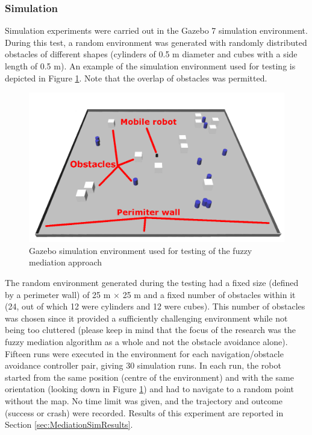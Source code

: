 \subsubsection{Simulation} \label{sec:MediationSimulation}
Simulation experiments were carried out in the Gazebo 7 simulation environment. During this test, a random environment was generated with randomly distributed obstacles of different shapes (cylinders of 0.5 m diameter and cubes with a side length of 0.5 m). An example of the simulation environment used for testing is depicted in Figure \ref{Fig:Gazebo3D}. Note that the overlap of obstacles was permitted.

\begin{figure}
\centering
\includegraphics[width=0.8\columnwidth]{slike/ex_simulation.png}
\caption{Gazebo simulation environment used for testing of the fuzzy mediation approach}
\label{Fig:Gazebo3D}
\end{figure}

The random environment generated during the testing had a fixed size (defined by a perimeter wall) of 25 m $\times$ 25 m and a fixed number of obstacles within it (24, out of which 12 were cylinders and 12 were cubes). This number of obstacles was chosen since it provided a sufficiently challenging environment while not being too cluttered (please keep in mind that the focus of the research was the fuzzy mediation algorithm as a whole and not the obstacle avoidance alone). Fifteen runs were executed in the environment for each navigation/obstacle avoidance controller pair, giving 30 simulation runs. In each run, the robot started from the same position (centre of the environment) and with the same orientation (looking down in Figure \ref{Fig:Gazebo3D}) and had to navigate to a random point without the map. No time limit was given, and the trajectory and outcome (success or crash) were recorded. Results of this experiment are reported in Section \ref{sec:MediationSimResults}.

